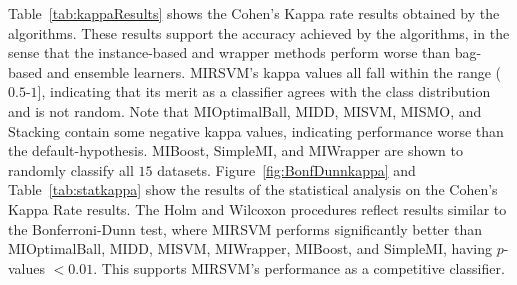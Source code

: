 \documentclass[reqno]{vcuthesis}
\numberwithin{equation}{chapter}
\begin{document}
\begin{table}[t!]
{}\vspace{-1.8em}
\label{fig:BonfDunnkappa}
\vspace{-1.3em}
\label{tab:statkappa}
\scriptsize
{}
\end{table}
Table~\ref{tab:kappaResults} shows the Cohen's Kappa rate results obtained by the algorithms. These results support the accuracy achieved by the algorithms, in the sense that the instance-based and wrapper methods perform worse than bag-based and ensemble learners. MIRSVM's kappa values all fall within the range ($0.5$-$1$], indicating that its merit as a classifier agrees with the class distribution and is not random. Note that MIOptimalBall, MIDD, MISVM, MISMO, and Stacking contain some negative kappa values, indicating performance worse than the default-hypothesis. MIBoost, SimpleMI, and MIWrapper are shown to randomly classify all $15$ datasets. Figure~\ref{fig:BonfDunnkappa} and Table~\ref{tab:statkappa} show the results of the statistical analysis on the Cohen's Kappa Rate results. The Holm and Wilcoxon procedures reflect results similar to the Bonferroni-Dunn test, where MIRSVM performs significantly better than MIOptimalBall, MIDD, MISVM, MIWrapper, MIBoost, and SimpleMI, having $p$-values $< 0.01$. This supports MIRSVM's performance as a competitive classifier.
\end{document}
